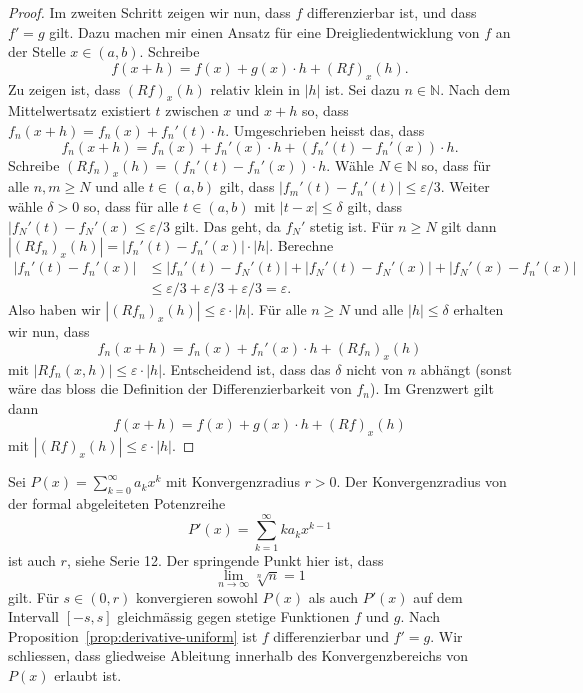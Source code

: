\documentclass[../main.tex]{subfiles}
\begin{document}
\begin{proof}
  Im zweiten Schritt zeigen wir nun, dass $f$ differenzierbar ist, und
  dass $f' = g$ gilt.
  Dazu machen mir einen Ansatz für eine Dreigliedentwicklung von $f$
  an der Stelle $x \in (a, b)$. Schreibe
  \[
    f(x + h) = f(x) + g(x) \cdot h + {(Rf)}_x(h).
  \]
  Zu zeigen ist, dass ${(Rf)}_x(h)$ relativ klein in $|h|$ ist.
  Sei dazu $n \in \mathbb{N}$.
  Nach dem Mittelwertsatz existiert $t$ zwischen $x$ und $x + h$ 
  so, dass $f_n(x + h) = f_n(x) + f_n'(t) \cdot h$.
  Umgeschrieben heisst das, dass
  \[
    f_n(x + h) = f_n(x) + f_n'(x) \cdot h + (f_n'(t) - f_n'(x)) \cdot h.
  \]
  Schreibe ${(Rf_n)}_x(h) = (f_n'(t) - f_n'(x)) \cdot h$.
  Wähle $N \in \mathbb{N}$ so, dass für alle $n, m \geq N$ und alle
  $t \in (a, b)$ gilt, dass $|f_m'(t) - f_n'(t)| \leq \varepsilon/3$.
  Weiter wähle $\delta > 0$ so, dass für alle $t \in (a, b)$ mit
  $|t - x| \leq \delta$ gilt, dass
  $|f_N'(t) - f_N'(x) \leq \varepsilon/3$ gilt. Das geht, da $f_N'$ stetig ist.
  Für $n \geq N$ gilt dann
  $|{(Rf_n)}_x(h)| = |f_n'(t) - f_n'(x)| \cdot |h|$.
  Berechne
  \begin{align*}
    |f_n'(t) - f_n'(x)|
    & \leq |f_n'(t) - f_N'(t)| + |f_N'(t) - f_N'(x)| + |f_N'(x) - f_n'(x)|\\
    &\leq \varepsilon/3 + \varepsilon/3 + \varepsilon/3 = \varepsilon.
  \end{align*}
  Also haben wir
  \(
    |{(Rf_n)}_{x}(h)| \leq \varepsilon \cdot |h|
  \).
  Für alle $n \geq N$ und alle $|h| \leq \delta$ erhalten wir nun, dass
  \[
    f_n(x + h) = f_n(x) + f_n'(x) \cdot h + {(Rf_n)}_x(h)
  \]
  mit $|Rf_n(x, h)| \leq \varepsilon \cdot |h|$.
  Entscheidend ist, dass das $\delta$ nicht von $n$ abhängt (sonst wäre das
  bloss die Definition der Differenzierbarkeit von $f_n$).
  Im Grenzwert gilt dann
  \[
    f(x + h) = f(x) + g(x) \cdot h + {(Rf)}_x(h)
  \]
  mit $|{(Rf)}_x(h)| \leq \varepsilon \cdot |h|$.
\end{proof}

\begin{application}
  Sei $P(x) = \sum_{k=0}^{\infty} a_k x^k$ mit Konvergenzradius $r > 0$.
  Der Konvergenzradius von der formal abgeleiteten Potenzreihe
  \[
    P'(x) = \sum_{k=1}^{\infty} k a_k x^{k-1}
  \]
  ist auch $r$, siehe Serie 12.
  Der springende Punkt hier ist, dass
  \[
    \lim_{n \to \infty} \sqrt[n]{n} = 1
  \]
  gilt. Für $s \in (0, r)$ konvergieren sowohl $P(x)$ als auch
  $P'(x)$ auf dem Intervall $[-s, s]$ gleichmässig gegen stetige Funktionen
  $f$ und $g$.
  Nach Proposition~\ref{prop:derivative-uniform} ist $f$ differenzierbar
  und $f' = g$.
  Wir schliessen, dass gliedweise Ableitung innerhalb des Konvergenzbereichs von
  $P(x)$ erlaubt ist.
\end{application}
\end{document}
